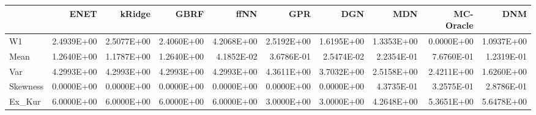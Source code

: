 \begin{tabular}{lrrrrrrrrr}
\toprule
{} &       ENET &     kRidge &       GBRF &       ffNN &        GPR &        DGN &        MDN &  MC-Oracle &        DNM \\
\midrule
W1       & 2.4939E+00 & 2.5077E+00 & 2.4060E+00 & 4.2068E+00 & 2.5192E+00 & 1.6195E+00 & 1.3353E+00 & 0.0000E+00 & 1.0937E+00 \\
Mean     & 1.2640E+00 & 1.1787E+00 & 1.2640E+00 & 4.1852E-02 & 3.6786E-01 & 2.5474E-02 & 2.2354E-01 & 7.6760E-01 & 1.2319E-01 \\
Var      & 4.2993E+00 & 4.2993E+00 & 4.2993E+00 & 4.2993E+00 & 4.3611E+00 & 3.7032E+00 & 2.5158E+00 & 2.4211E+00 & 1.6260E+00 \\
Skewness & 0.0000E+00 & 0.0000E+00 & 0.0000E+00 & 0.0000E+00 & 0.0000E+00 & 0.0000E+00 & 4.3735E-01 & 3.2575E-01 & 2.8786E-01 \\
Ex\_Kur   & 6.0000E+00 & 6.0000E+00 & 6.0000E+00 & 6.0000E+00 & 3.0000E+00 & 3.0000E+00 & 4.2648E+00 & 5.3651E+00 & 5.6478E+00 \\
\bottomrule
\end{tabular}
